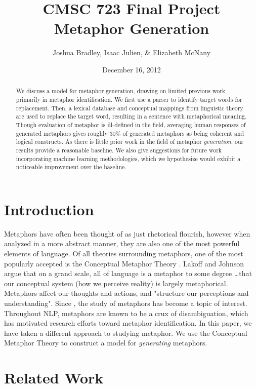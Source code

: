 \documentclass[12pt]{article}
\title{CMSC 723 Final Project\\
Metaphor Generation}
\author{Joshua Bradley, Isaac Julien, \& Elizabeth McNany}
\date{December 16, 2012}
\begin{document}
\maketitle

\begin{abstract}
We discuss a model for metaphor generation, drawing on limited previous work primarily in metaphor identification.  We first use a parser to identify target words for replacement.  Then, a lexical database and conceptual mappings from linguistic theory are used to replace the target word, resulting in a sentence with metaphorical meaning.  Though evaluation of metaphor is ill-defined in the field, averaging human responses of generated metaphors gives roughly 30\% of generated metaphors as being coherent and logical constructs.  As there is little prior work in the field of metaphor \emph{generation}, our results provide a reasonable baseline. We also give suggestions for future work incorporating machine learning methodologies, which we hypothesize would exhibit a noticeable improvement over the baseline.
\end{abstract}

\newpage
\tableofcontents
\newpage

\section{Introduction}

Metaphors have often been thought of as just rhetorical flourish, however when analyzed in a more abstract manner, they are also one of the most powerful elements of language. Of all theories surrounding metaphors, one of the most popularly accepted is the Conceptual Metaphor Theory \cite{lakoff80}. Lakoff and Johnson argue that on a grand scale, all of language is a metaphor to some degree \ldots that our conceptual system (how we perceive reality) is largely metaphorical. Metaphors affect our thoughts and actions, and "structure our perceptions and understanding". Since \cite{lakoff80}, the study of metaphors has become a topic of interest. Throughout NLP, metaphors are known to be a crux of disambiguation, which has motivated research efforts toward metaphor identification. In this paper, we have taken a different approach to studying metaphor. We use the Conceptual Metaphor Theory to construct a model for \emph{generating} metaphors.

\section{Related Work}
\end{document}
